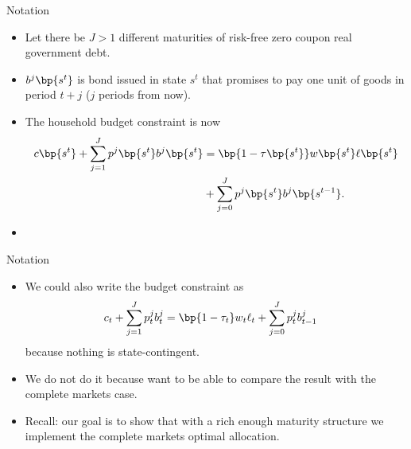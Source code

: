 \documentclass[11pt,xcolor={dvipsnames},aspectratio=159,hyperref={pdftex,pdfpagemode=UseNone,hidelinks,pdfdisplaydoctitle=true},usepdftitle=false]{beamer}
\begin{document}
\begin{frame}
\end{frame}

\begin{frame}{Notation}

    \begin{itemize}
        \item Let there be $J>1$ different maturities of risk-free zero coupon real government debt. 
        \item $b^{j}\bp{s^t}$ is bond issued in state $s^t$ that promises to pay one unit of goods in period $t+j$ ($j$ periods from now).
          
        \item The household budget constraint is now \begin{align*}
            c\bp{s^t} + \sum_{j=1}^J p^j\bp{s^t} b^j\bp{s^t} &= \bp{1-\tau\bp{s^t}} w\bp{s^t} \ell\bp{s^t} \\
        & + \sum_{j=0}^J p^j\bp{s^t} b^j\bp{s^{t-1}}.
        \end{align*}
        \item 
    \end{itemize}
\end{frame}

\begin{frame}{Notation}
 \begin{itemize}
    \item We could also write the budget constraint as 
    \begin{align*}
        c_t + \sum_{j=1}^J p^j_t b^j_t &= \bp{1-\tau_t} w_t \ell_t + \sum_{j=0}^J p^j_t b^j_{t-1}
    \end{align*}
    because nothing is state-contingent.
    \item We do not do it because want to be able to compare the result with the complete markets case. 
    \item Recall: our goal is to show that with a rich enough maturity structure we implement the complete markets optimal allocation.
 \end{itemize}

\end{frame}
\end{document}
